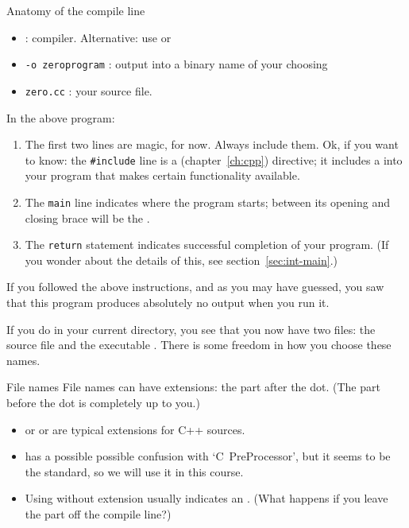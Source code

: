 \begin{slide}{Anatomy of the compile line}
  \label{sl:compile-line}
  \begin{itemize}
  \item {} : compiler. Alternative: use 
    or 
  \item \texttt{-o zeroprogram} : output into a binary name of your choosing
  \item \texttt{zero.cc} : your source file.
  \end{itemize}
\end{slide}

In the above program:
\begin{enumerate}
\item The first two lines are magic, for now. Always include them.
  Ok, if you want to know: the \lstinline+#include+ line
  is a  (chapter~\ref{ch:cpp}) directive;
  it includes a 
  into your program that makes certain functionality available.
\item The \lstinline{main} line indicates where the program starts; between
  its opening and closing brace will be the
  .
\item The \lstinline{return} statement indicates successful completion of your program.
  (If you wonder about the details of this, see section~\ref{sec:int-main}.)
\end{enumerate}
If you followed the above instructions, 
and as you may have guessed,
you saw that this program produces absolutely no output
when you run it.

If you do  in your current directory,
you see that you now have two files: the source file 
and the executable .
There is some freedom in how you choose these names.

\begin{block}{File names}
  \label{sl:file-ext}
  File names can have extensions: the part after the dot.
  (The part before the dot is completely up to you.)
  \begin{itemize}
  \item {} or  or 
    are typical extensions for
    C++ sources.
  \item {} has a possible
    possible confusion with `C~PreProcessor',
    but it seems to be the standard, so we will use it in this course.
  \item Using  without extension usually indicates an .
    (What happens if you leave the  part off the compile line?)
  \end{itemize}
\end{block}

